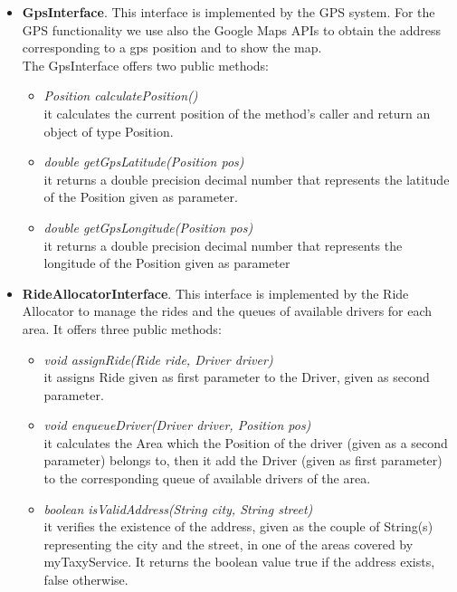 \documentclass[\mainpath/main]{subfiles}
\begin{document}
\begin{itemize}
	
	\item \textbf{GpsInterface}. This interface is implemented by the GPS system. For the GPS functionality we use also the Google Maps APIs to obtain the address corresponding to a gps position and to show the map.\\
	The GpsInterface offers two public methods:
	\begin{itemize}
		\item \textit{Position calculatePosition()}\\
		it calculates the current position of the method's caller and return an object of type Position.
		\item \textit{double getGpsLatitude(Position pos)}\\
		it returns a double precision decimal number that represents the latitude of the Position given as parameter.
		\item \textit{double getGpsLongitude(Position pos)}\\
		it returns a double precision decimal number that represents the longitude of the Position given as parameter
		\\
	\end{itemize}
	
	\item \textbf{RideAllocatorInterface}. This interface is implemented by the Ride Allocator to manage the rides and the queues of available drivers for each area. It offers three public methods:
	\begin{itemize}
		\item \textit{void assignRide(Ride ride, Driver driver)}\\
		it assigns Ride given as first parameter to the Driver, given as second parameter.
		\item \textit{void enqueueDriver(Driver driver, Position pos)}\\
		it calculates the Area which the Position of the driver (given as a second parameter) belongs to, then it add the Driver (given as first parameter) to the corresponding queue of available drivers of the area.
		\item \textit{boolean isValidAddress(String city, String street)}\\
		it verifies the existence of the address, given as the couple of String(s) representing the city and the street, in one of the areas covered by myTaxyService. It returns the boolean value true if the address exists, false otherwise.
		\\
	\end{itemize}	
	

\end{itemize}
\end{document}
